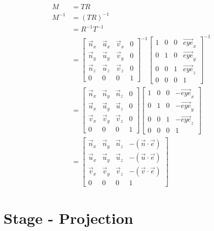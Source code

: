   \begin{align}
    M &= T R \\
    M^{-1} &= \left( T R \right)^{-1} \\
    &= R^{-1} T^{-1} \\
    &=
    \begin{bmatrix}
      \vec{n}_{x} & \vec{u}_{x} & \vec{v}_{x} & 0 \\
      \vec{n}_{y} & \vec{u}_{y} & \vec{v}_{y} & 0 \\
      \vec{n}_{z} & \vec{u}_{z} & \vec{v}_{z} & 0 \\
      0 & 0 & 0 & 1
    \end{bmatrix}^{-1}
    \begin{bmatrix}
      1 & 0 & 0 & \vec{eye}_{x} \\
      0 & 1 & 0 & \vec{eye}_{y} \\
      0 & 0 & 1 & \vec{eye}_{z} \\
      0 & 0 & 0 & 1
    \end{bmatrix}^{-1} \\
    &=
    \begin{bmatrix}
      \vec{n}_{x} & \vec{n}_{y} & \vec{n}_{z} & 0 \\
      \vec{u}_{x} & \vec{u}_{y} & \vec{u}_{z} & 0 \\
      \vec{v}_{x} & \vec{v}_{y} & \vec{v}_{z} & 0 \\
      0 & 0 & 0 & 1
    \end{bmatrix}
    \begin{bmatrix}
      1 & 0 & 0 & -\vec{eye}_{x} \\
      0 & 1 & 0 & -\vec{eye}_{y} \\
      0 & 0 & 1 & -\vec{eye}_{z} \\
      0 & 0 & 0 & 1
    \end{bmatrix} \\
    &=
    \begin{bmatrix}
      \vec{n}_{x} & \vec{n}_{y} & \vec{n}_{z} & -\left( \vec{n} \cdot \vec{e} \right) \\
      \vec{u}_{x} & \vec{u}_{y} & \vec{u}_{z} & -\left( \vec{u} \cdot \vec{e} \right) \\
      \vec{v}_{x} & \vec{v}_{y} & \vec{v}_{z} & -\left( \vec{v} \cdot \vec{e} \right) \\
      0 & 0 & 0 & 1
    \end{bmatrix}
  \end{align}

\section{Stage - Projection}

